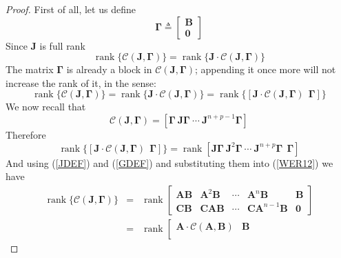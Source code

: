 \documentclass[a4paper,10pt,oneside]{book}
\begin{document}
\begin{proof}
 First of all, let us define
\begin{equation}
 \mathbf{\Gamma}\triangleq\left[ {\begin{array}{c}\mathbf{B}  \\ \mathbf{0}  \end{array} } \right]\label{GDEF}
\end{equation}
Since $\mathbf{J}$ is full rank
\begin{equation}
 \operatorname{rank}\{ \mathcal{C}(\mathbf{J},\mathbf{\Gamma})\} =\operatorname{rank}\{\mathbf{J}\cdot\mathcal{C}(\mathbf{J},\mathbf{\Gamma})\}
\end{equation}
The matrix $\mathbf{\Gamma}$ is already a block in $\mathcal{C}(\mathbf{J},\mathbf{\Gamma})$; appending it once more will not increase the rank of it, in the sense:
\begin{equation}
 \operatorname{rank}\{ \mathcal{C}(\mathbf{J},\mathbf{\Gamma})\} =\operatorname{rank}\{\mathbf{J}\cdot\mathcal{C}(\mathbf{J},\mathbf{\Gamma})\}=\operatorname{rank}\{[\mathbf{J}\cdot\mathcal{C}(\mathbf{J},\mathbf{\Gamma})\ \ \mathbf{\Gamma}]\}
\end{equation}
We now recall that
\begin{equation}
  \mathcal{C}(\mathbf{J},\mathbf{\Gamma})=[\mathbf{\Gamma}\ \mathbf{J\Gamma}\ \cdots \ \mathbf{J}^{n+p-1}\mathbf{\Gamma}]
\end{equation}
Therefore
\begin{equation}
  \operatorname{rank}\{[\mathbf{J}\cdot\mathcal{C}(\mathbf{J},\mathbf{\Gamma})\ \ \mathbf{\Gamma}]\} = \operatorname{rank}[\mathbf{J\Gamma}\ \mathbf{J}^2\mathbf{\Gamma}\ \cdots \ \mathbf{J}^{n+p}\mathbf{\Gamma}\ \ \mathbf{\Gamma} ]\label{WER12}
\end{equation}
And using (\ref{JDEF}) and (\ref{GDEF}) and substituting them into (\ref{WER12}) we have
\begin{eqnarray*}
  \operatorname{rank}\{\mathcal{C}(\mathbf{J},\mathbf{\Gamma})\} &=& 
\operatorname{rank}\left[ {\begin{array}{ccccc}
      \mathbf{AB} & \mathbf{A}^2\mathbf{B} & \cdots & \mathbf{A}^n\mathbf{B} & \mathbf{B}\\ 
      \mathbf{CB} & \mathbf{CAB} & \cdots & \mathbf{CA}^{n-1}\mathbf{B} & \mathbf{0}
\end{array} } \right]\\
&=&\operatorname{rank}\left[ {\begin{array}{cc}
      \mathbf{A}\cdot\mathcal{C}(\mathbf{A},\mathbf{B}) & \mathbf{B} \\ 

\end{array}}
\end{eqnarray*}
\end{proof}
\end{document}

